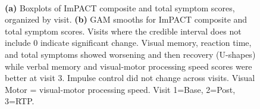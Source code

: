 \documentclass[12pt]{article}
\begin{document}
\begin{figure}[H]
	\\
	\caption{\textbf{(a)} Boxplots of ImPACT composite and total symptom scores, organized by visit. \textbf{(b)} GAM smooths for ImPACT composite and total symptom scores. Visits where the credible interval does not include 0 indicate significant change. Visual memory, reaction time, and total symptoms showed worsening and then recovery (U-shapes) while verbal memory and visual-motor processing speed scores were better at visit 3. Impulse control did not change across visits. Visual Motor = visual-motor processing speed. Visit 1=Base, 2=Post, 3=RTP.}
	\label{fig:imp-gam}
\end{figure}
\end{document}
